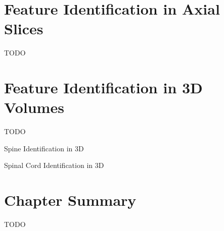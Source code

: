 \section{Feature Identification in Axial Slices}

TODO

\section{Feature Identification in 3D Volumes}

TODO

\begin{stulisting}[p]
\caption{Spine Identification in 3D}
\label{code:featureid-3d-spineidentification}

\end{stulisting}

\begin{stulisting}[p]
\caption{Spinal Cord Identification in 3D}
\label{code:featureid-3d-spinalcordidentification}

\end{stulisting}

\section{Chapter Summary}

TODO

